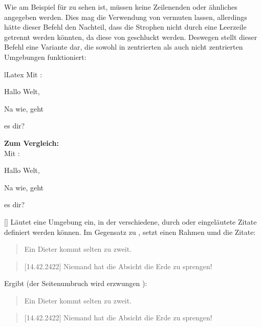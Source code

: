 Wie am Beispiel für  zu sehen ist, müssen keine Zeilenenden oder ähnliches angegeben werden. Dies mag die Verwendung von  vermuten lassen, allerdings hätte dieser Befehl den Nachteil, dass die Strophen nicht durch eine Leerzeile getrennt werden könnten, da diese von  geschluckt werden. Deswegen stellt dieser Befehl eine Variante dar, die sowohl in zentrierten als auch nicht zentrierten Umgebungen funktioniert:
\begin{defaultlst}[][listing side text,righthand width=3.5cm]{lLatex}
Mit :
{
    \subduelines
    Hallo Welt,

    Na wie,
    geht

    es dir?
}

\textbf{Zum Vergleich: }\\
Mit :

{
    \obeylines
    Hallo Welt,

    Na wie,
    geht

    es dir?
}
\end{defaultlst}

%
%
%

[]
Läutet eine Umgebung ein, in der verschiedene, durch  oder  eingeläutete Zitate definiert werden können. Im Gegensatz zu , setzt  einen Rahmen umd die Zitate:
\begin{latex}
\begin{quotes}
    \begin{quote}
        Ein Dieter kommt selten zu zweit.
    \end{quote}
    \begin{quote}[14.42.2422]
        Niemand hat die Absicht die Erde zu sprengen!
    \end{quote}
\end{quotes}
\end{latex}
Ergibt (der Seitenumbruch wird erzwungen \Smiley):
\begin{quotes}[Testzitate]
    \begin{quote}
        Ein Dieter kommt selten zu zweit.
    \end{quote}
    \begin{quote}[14.42.2422]
        Niemand hat die Absicht die Erde zu sprengen!
    \end{quote}
\end{quotes}

